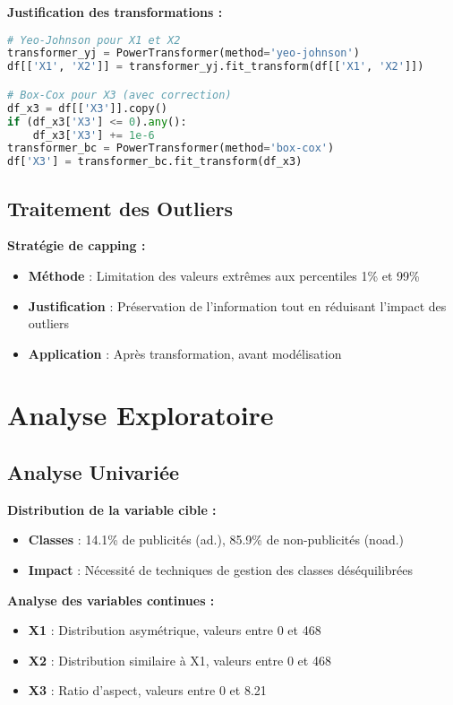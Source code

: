 \documentclass[12pt,a4paper]{article}
\begin{document}
\textbf{Justification des transformations :}
\begin{lstlisting}[language=Python, caption=Code de transformation]
# Yeo-Johnson pour X1 et X2
transformer_yj = PowerTransformer(method='yeo-johnson')
df[['X1', 'X2']] = transformer_yj.fit_transform(df[['X1', 'X2']])

# Box-Cox pour X3 (avec correction)
df_x3 = df[['X3']].copy()
if (df_x3['X3'] <= 0).any(): 
    df_x3['X3'] += 1e-6
transformer_bc = PowerTransformer(method='box-cox')
df['X3'] = transformer_bc.fit_transform(df_x3)
\end{lstlisting}

\subsection{Traitement des Outliers}

\textbf{Stratégie de capping :}
\begin{itemize}
    \item \textbf{Méthode} : Limitation des valeurs extrêmes aux percentiles 1\% et 99\%
    \item \textbf{Justification} : Préservation de l'information tout en réduisant l'impact des outliers
    \item \textbf{Application} : Après transformation, avant modélisation
\end{itemize}

\section{Analyse Exploratoire}

\subsection{Analyse Univariée}

\textbf{Distribution de la variable cible :}
\begin{itemize}
    \item \textbf{Classes} : 14.1\% de publicités (ad.), 85.9\% de non-publicités (noad.)
    \item \textbf{Impact} : Nécessité de techniques de gestion des classes déséquilibrées
\end{itemize}

\textbf{Analyse des variables continues :}
\begin{itemize}
    \item \textbf{X1} : Distribution asymétrique, valeurs entre 0 et 468
    \item \textbf{X2} : Distribution similaire à X1, valeurs entre 0 et 468
    \item \textbf{X3} : Ratio d'aspect, valeurs entre 0 et 8.21
\end{itemize}
\end{document}
